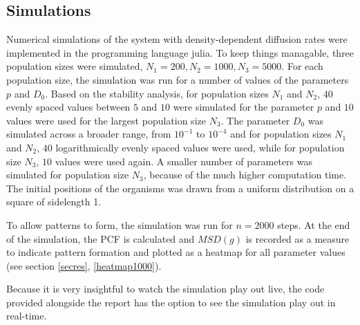 \documentclass{article}
\begin{document}
\subsection{Simulations}
Numerical simulations of the system with density-dependent diffusion rates were implemented in the programming language julia.
To keep things managable, three population sizes were simulated, $N_1=200, N_2 = 1000, N_3 = 5000$.
For each population size, the simulation was run for a number of values of the parameters $p$ and $D_0$.
Based on the stability analysis, for population sizes $N_1$ and $N_2$, $40$ evenly spaced values between $5$ and $10$ were simulated for the parameter $p$ and $10$ values were used for the largest population size $N_3$.
The parameter $D_0$ was simulated across a broader range, from $10^{-1}$ to $10^{-4}$ and for population sizes $N_1$ and $N_2$, $40$ logarithmically evenly spaced values were used, while for population size $N_3$, $10$ values were used again.
A smaller number of parameters was simulated for population size $N_3$, because of the much higher computation time.
The initial positions of the organisms was drawn from a uniform distribution on a square of sidelength 1.

To allow patterns to form, the simulation was run for $n=2000$ steps. 
At the end of the simulation, the PCF is calculated and $MSD(g)$ is recorded as a measure to indicate pattern formation and plotted as a heatmap for all parameter values (see section \ref{secres}, \ref{heatmap1000}).

Because it is very insightful to watch the simulation play out live, the code provided alongside the report has the option to see the simulation play out in real-time.
\end{document}
